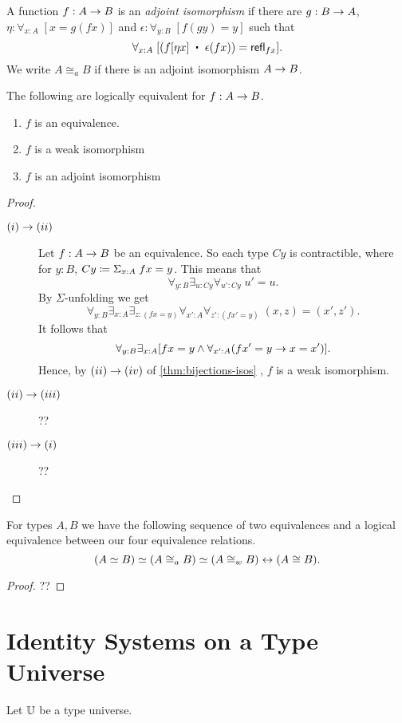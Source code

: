 \begin{defn} A function $f:A\rightarrow B$ is an {\em adjoint isomorphism} if there are $g:B\rightarrow A$, $\eta:\forall_{x:A}\; [x=g(fx)]$ and $\epsilon:\forall_{y:B}\; [f(gy)=y]$ such that 
  \[\forall_{x:A}\;[(\map{f}{\eta x}\; \ct\;\epsilon(fx))=\refl{fx}].\]
We write $A\cong_a B$ if there is an adjoint isomorphism $A\rightarrow B$.
\end{defn}
\begin{thm}\label{thm:equiv-iso-adj} The following are logically equivalent for $f:A\rightarrow B$.
\begin{enumerate}
\item $f$ is an equivalence.
\item $f$ is a weak isomorphism
\item $f$ is an adjoint isomorphism
\end{enumerate}
\end{thm}
\begin{proof} $\;$

\begin{description}
\item[$(i)\rightarrow (ii)$] 
Let $f:A\rightarrow B$ be an equivalence.  So each type $Cy$ is contractible, where for $y:B$, $Cy \coloneqq \Sigma_{x:A}\; fx=y$.  This means that
  \[ \forall_{y:B}\exists_{u:Cy}\forall_{u':Cy}\; u'=u.\]
By $\Sigma$-unfolding we get
  \[ \forall_{y:B}\exists_{x:A}\exists_{z:(fx=y)}
                            \forall_{x':A}\forall_{z':(fx'=y)}\; (x,z)=(x',z').
  \]
It follows that
  \[ \forall_{y:B}\exists_{x:A}[fx=y\wedge\forall_{x':A}(fx'=y\rightarrow  x=x')].
  \]
Hence, by $(ii)\rightarrow (iv)$ of \autoref{thm:bijections-isos} , $f$ is a weak isomorphism.
\item[$(ii)\rightarrow (iii)$] ??
\item[$(iii)\rightarrow (i)$] ??
\end{description}
\end{proof}
\begin{cor}\label{cor:equivs-equiv}
For types $A,B$ we have the following sequence of two equivalences and a logical equivalence
between our four equivalence relations.
  \[ (A \simeq B) \simeq (A\cong_a B) \simeq (A\cong_w B) \leftrightarrow (A\cong B).\]
\end{cor}
\begin{proof} ??

\end{proof}

\section{Identity Systems on a Type Universe}
\newcommand{\sfr}[1]{{{\sf r}_{#1}}}
Let $\mathbb{U}$ be a type universe.

